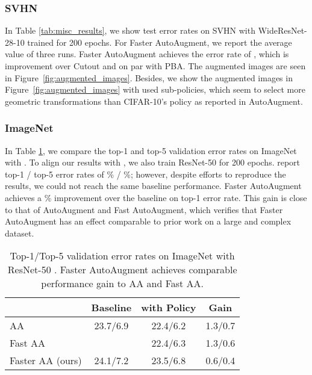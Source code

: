 \documentclass[10pt,twocolumn,letterpaper]{article}
\def\Figref#1{Figure~\ref{#1}}
\newcommand{\Tabref}[1]{Table \ref{#1}}
\newcommand{\autoaugment}{AutoAugment\xspace}
\newcommand{\faster}{Faster \autoaugment}
\newcommand{\fast}{Fast \autoaugment}
\begin{document}
\subsubsection*{SVHN}

In \Tabref{tab:misc_results}, we show test error rates on SVHN with WideResNet-28-10 trained for 200 epochs. For \faster, we report the average value of three runs. \faster achieves the error rate of , which is  improvement over Cutout and on par with PBA. The augmented images are seen in \Figref{fig:augmented_images}. Besides, we show the augmented images in \Figref{fig:augmented_images} with used sub-policies, which seem to select more geometric transformations than CIFAR-10's policy as reported in \autoaugment \cite{Cubuk2018}.


\subsubsection*{ImageNet}

In \Tabref{tab:imagenet_results}, we compare the top-1 and top-5 validation error rates on ImageNet with \cite{Cubuk2018,Lim2019}. To align our results with \cite{Cubuk2018}, we also train ResNet-50 for 200 epochs. \cite{Cubuk2018,Lim2019} report top-1 / top-5 error rates of \% / \%; however, despite efforts to reproduce the results, we could not reach the same baseline performance. \faster achieves a \% improvement over the baseline on top-1 error rate. This gain is close to that of \autoaugment and \fast, which verifies that \faster has an effect comparable to prior work on a large and complex dataset.


\begin{table}
    \centering
    \begin{tabular}{lccc}
                           & Baseline & with Policy & Gain  \\ \hline
       AA \cite{Cubuk2018} &  23.7/6.9      &   22.4/6.2      &     1.3/0.7            \\
       Fast AA \cite{Lim2019} &       & 22.4/6.3      &       1.3/0.6          \\ \hline
       Faster AA (ours)  &   24.1/7.2        &  23.5/6.8      &     0.6/0.4             
    \end{tabular}
    \vspace{5pt}
    \caption{Top-1/Top-5 validation error rates on ImageNet \cite{Russakovsky2015} with ResNet-50 \cite{He2016b}. \faster achieves comparable performance gain to AA and Fast AA.}
    \label{tab:imagenet_results}
\end{table}
\end{document}
